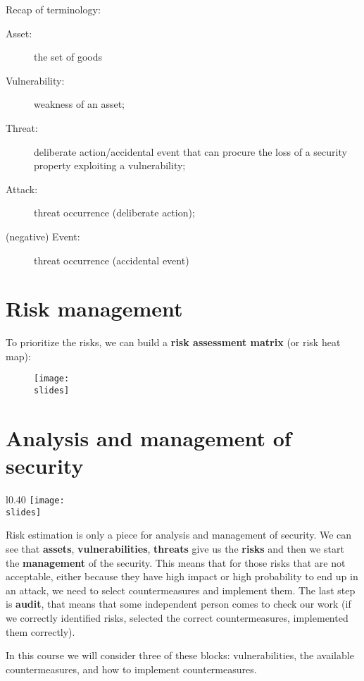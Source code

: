 \bigskip
Recap of terminology:
\begin{description}
  \item[Asset:] the set of goods
  \item[Vulnerability:] weakness of an asset;
  \item[Threat:] deliberate action/accidental event that can procure the loss of a security property exploiting a vulnerability;
  \item[Attack:] threat occurrence (deliberate action);
  \item[(negative) Event:] threat occurrence (accidental event)
\end{description}


\section{Risk management}
To prioritize the risks, we can build a \textbf{risk assessment matrix} (or risk heat map):
\begin{figure}[h]
  \texttt{[image: \\slides]}
\end{figure}


\section{Analysis and management of security}

\begin{wrapfigure}{l}{0.40\textwidth}
  \centering
  \texttt{[image: \\slides]}
\end{wrapfigure}
Risk estimation is only a piece for analysis and management of security. We can see that \textbf{assets}, \textbf{vulnerabilities}, \textbf{threats} give us the \textbf{risks} and then we start the \textbf{management} of the security. This means that for those risks that are not acceptable, either because they have high impact or high probability to end up in an attack, we need to select countermeasures and implement them. The last step is \textbf{audit}, that means that some independent person comes to check our work (if we correctly identified risks, selected the correct countermeasures, implemented them correctly).

In this course we will consider three of these blocks: vulnerabilities, the available countermeasures, and how to implement countermeasures.


